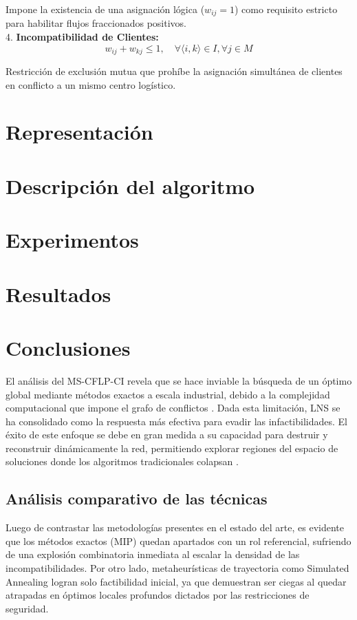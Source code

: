 \documentclass[letter, 10pt]{article}
\begin{document}
Impone la existencia de una asignación lógica ($w_{ij}=1$) como requisito estricto para habilitar flujos fraccionados positivos.\\

4. \textbf{Incompatibilidad de Clientes:} 
\begin{equation}
    w_{ij} + w_{kj} \leq 1, \quad \forall \langle i, k \rangle \in I, \forall j \in M
\end{equation}

Restricción de exclusión mutua que prohíbe la asignación simultánea de clientes en conflicto a un mismo centro logístico.\\

\section{Representación}

\section{Descripción del algoritmo}

\section{Experimentos}

\section{Resultados}

\section{Conclusiones}
El análisis del MS-CFLP-CI revela que se hace inviable la búsqueda de un óptimo global mediante métodos exactos a escala industrial, debido a la complejidad computacional que impone el grafo de conflictos \cite{ceschia2024}. Dada esta limitación, LNS se ha consolidado como la respuesta más efectiva para evadir las infactibilidades. El éxito de este enfoque se debe en gran medida a su capacidad para destruir y reconstruir dinámicamente la red, permitiendo explorar regiones del espacio de soluciones donde los algoritmos tradicionales colapsan \cite{Gjergji2025}.

\subsection{Análisis comparativo de las técnicas}
Luego de contrastar las metodologías presentes en el estado del arte, es evidente que los métodos exactos (MIP) quedan apartados con un rol referencial, sufriendo de una explosión combinatoria inmediata al escalar la densidad de las incompatibilidades. Por otro lado, metaheurísticas de trayectoria como Simulated Annealing logran solo factibilidad inicial, ya que demuestran ser ciegas al quedar atrapadas en óptimos locales profundos dictados por las restricciones de seguridad.\\
\end{document}
